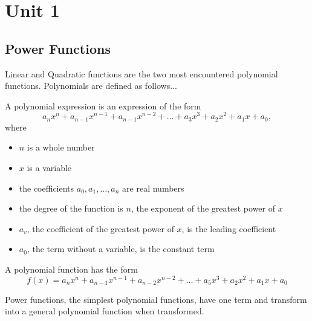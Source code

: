 \documentclass{article}
\begin{document}
\newpage    
\section{Unit 1}
\subsection{Power Functions}

\begin{minipage}[t]{\textwidth}
Linear and Quadratic functions are the two most encountered polynomial functions. Polynomials are defined as follows...

A polynomial expression is an expression of the form
\[
a_n x^n + a_{n-1} x^{n-1} + a_{n-1} x^{n-2} + \ldots + a_3 x^3 + a_2 x^2 + a_1 x + a_0,
\]
where
\begin{itemize}
    \item \( n \) is a whole number
    \item \( x \) is a variable
    \item the coefficients \( a_0, a_1, \ldots, a_n \) are real numbers
    \item the degree of the function is \( n \), the exponent of the greatest power of \( x \)
    \item \( a_v \), the coefficient of the greatest power of \( x \), is the leading coefficient
    \item \( a_0 \), the term without a variable, is the constant term
\end{itemize}

A polynomial function has the form
\[
f(x) = a_n x^n + a_{n-1} x^{n-1} + a_{n-2} x^{n-2} + \ldots + a_5 x^3 + a_2 x^2 + a_1 x + a_0
\]

Power functions, the simplest polynomial functions, have one term and transform into a general polynomial function when transformed.
\end{minipage}

\vspace{0.5cm}
\end{document}
